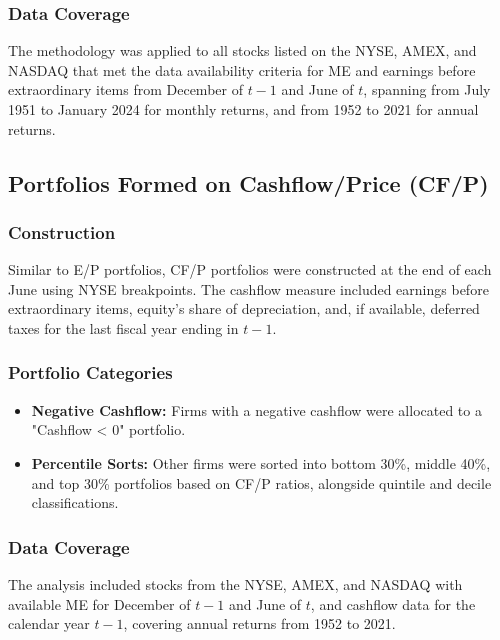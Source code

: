 \documentclass{article}
\begin{document}
\subsubsection*{Data Coverage}

The methodology was applied to all stocks listed on the NYSE, AMEX, and NASDAQ that met the data availability criteria for ME and earnings before extraordinary items from December of $t-1$ and June of $t$, spanning from July 1951 to January 2024 for monthly returns, and from 1952 to 2021 for annual returns.

\subsection*{Portfolios Formed on Cashflow/Price (CF/P)}

\subsubsection*{Construction}

Similar to E/P portfolios, CF/P portfolios were constructed at the end of each June using NYSE breakpoints. The cashflow measure included earnings before extraordinary items, equity's share of depreciation, and, if available, deferred taxes for the last fiscal year ending in $t-1$.

\subsubsection*{Portfolio Categories}

\begin{itemize}
    \item \textbf{Negative Cashflow:} Firms with a negative cashflow were allocated to a "Cashflow < 0" portfolio.
    \item \textbf{Percentile Sorts:} Other firms were sorted into bottom 30\%, middle 40\%, and top 30\% portfolios based on CF/P ratios, alongside quintile and decile classifications.
\end{itemize}

\subsubsection*{Data Coverage}

The analysis included stocks from the NYSE, AMEX, and NASDAQ with available ME for December of $t-1$ and June of $t$, and cashflow data for the calendar year $t-1$, covering annual returns from 1952 to 2021.
\end{document}
